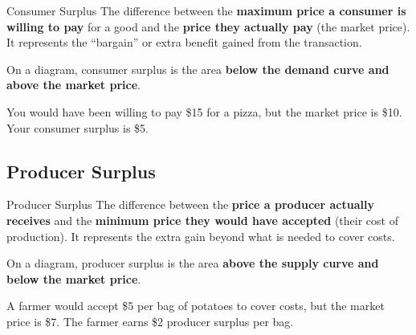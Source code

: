 \documentclass[11pt, a4paper, twoside]{book}
\begin{document}
\begin{keyterm}{Consumer Surplus}
The difference between the \textbf{maximum price a consumer is willing to pay} for a good and the \textbf{price they actually pay} (the market price). It represents the ``bargain'' or extra benefit gained from the transaction.

On a diagram, consumer surplus is the area \textbf{below the demand curve and above the market price}.
\end{keyterm}

\begin{example}
You would have been willing to pay \$15 for a pizza, but the market price is \$10. Your consumer surplus is \$5.
\end{example}

\subsection{Producer Surplus}

\begin{keyterm}{Producer Surplus}
The difference between the \textbf{price a producer actually receives} and the \textbf{minimum price they would have accepted} (their cost of production). It represents the extra gain beyond what is needed to cover costs.

On a diagram, producer surplus is the area \textbf{above the supply curve and below the market price}.
\end{keyterm}

\begin{example}
A farmer would accept \$5 per bag of potatoes to cover costs, but the market price is \$7. The farmer earns \$2 producer surplus per bag.
\end{example}
\end{document}
